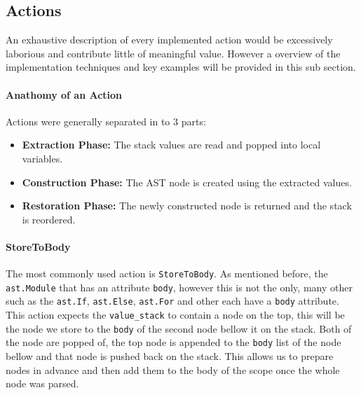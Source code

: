 \subsection{Actions}
An exhaustive description of every implemented action would be excessively laborious and contribute little of meaningful value. However a overview of the implementation techniques and key examples will be provided in this sub section.

\paragraph{Anathomy of an Action}
Actions were generally separated in to 3 parts:
\begin{itemize}
  \item \textbf{Extraction Phase:} The stack values are read and popped into local variables.
  \item \textbf{Construction Phase:} The AST node is created using the extracted values.
  \item \textbf{Restoration Phase:} The newly constructed node is returned and the stack is reordered.
\end{itemize}

\paragraph{StoreToBody}
The most commonly used action is \texttt{StoreToBody}. As mentioned before, the \texttt{ast.Module} that has an attribute \texttt{body}, however this is not the only, many other such as the \texttt{ast.If}, \texttt{ast.Else}, \texttt{ast.For} and other each have a \texttt{body} attribute. This action expects the \texttt{value\_stack} to contain a node on the top, this will be the node we store to the \texttt{body} of the second node bellow it on the stack. Both of the node are popped of, the top node is appended to the \texttt{body} list of the node bellow and that node is pushed back on the stack. This allows us to prepare nodes in advance and then add them to the body of the scope once the whole node was parsed.

